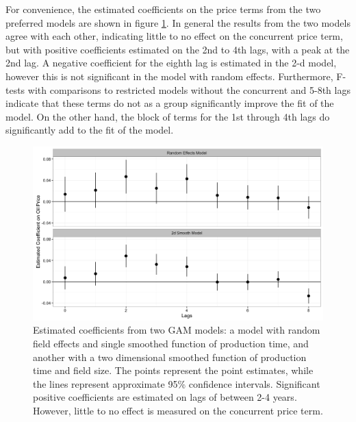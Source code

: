 \documentclass[12pt]{article}
\begin{document}
 
For convenience, the estimated coefficients on the price terms from the two preferred models are shown in figure \ref{price_coefficients}. In general the results from the two models agree with each other, indicating little to no effect on the concurrent price term, but with positive coefficients estimated on the 2nd to 4th lags, with a peak at the 2nd lag. A negative coefficient for the eighth lag is estimated in the 2-d model, however this is not significant in the model with random effects. Furthermore, F-tests with comparisons to restricted models without the concurrent and 5-8th lags indicate that these terms do not as a group significantly improve the fit of the model. On the other hand, the block of terms for the 1st through 4th lags do significantly add to the fit of the model.

\begin{figure}
	\includegraphics[width=1\textwidth]{figures/price_coefficents.png}
	\caption{Estimated coefficients from two GAM models: a model with random field effects and single smoothed function of production time, and another with a two dimensional smoothed function of production time and field size.  The points represent the point estimates, while the lines represent approximate 95\% confidence intervals. Significant positive coefficients are estimated on lags of between 2-4 years.  However, little to no effect is measured on the concurrent price term.}
	\label{price_coefficients}
\end{figure}
\end{document}
